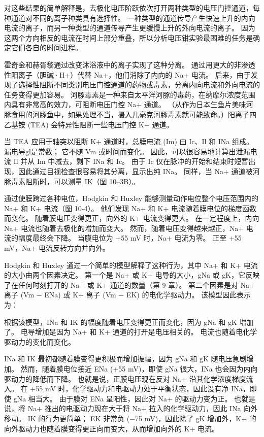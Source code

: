 对这些结果的简单解释是，去极化电压阶跃依次打开两种类型的电压门控通道，每种通道对不同的离子种类具有选择性。 一种类型的通道传导产生快速上升的内向电流的离子，而另一种类型的通道传导产生更缓慢上升的外向电流的离子。 因为这两个方向相反的电流在时间上部分重叠，所以分析电压钳实验最困难的任务是确定它们各自的时间进程。

霍奇金和赫胥黎通过改变沐浴液中的离子实现了这种分离。 通过用更大的非渗透性阳离子（胆碱·H+）代替 Na+，他们消除了内向的 Na+ 电流。 后来，由于发现了选择性阻断不同类别电压门控通道的药物或毒素，分离内向电流和外向电流的任务变得更加容易。 河豚毒素是一种来自太平洋河豚的毒药，在纳摩尔浓度范围内具有非常高的效力，可阻断电压门控 Na+ 通道。 （从作为日本生鱼片美味河豚食用的河豚鱼中，如果处理不当，摄入几毫克河豚毒素就可能致命。）阳离子四乙基铵 (TEA) 会特异性阻断一些电压门控 K+ 通道。

当 TEA 应用于轴突以阻断 K+ 通道时，总膜电流 (Im) 由 Ic、Il 和 INa 组成。 漏电导gl是常数； 它不随 Vm 或时间而变化。 因此，可以很容易地计算出泄漏电流 Il 并从 Im 中减去，剩下 INa 和 Ic。 由于 Ic 仅在脉冲的开始和结束时短暂出现，因此通过目视检查很容易将其分离，显示出纯 INa。 同样，当 Na+ 通道被河豚毒素阻断时，可以测量 IK（图 10–3B）。

通过使膜跨过各种电位，Hodgkin 和 Huxley 能够测量动作电位整个电压范围内的 Na+ 和 K+ 电流（图 10-4）。 他们发现 Na+ 和 K+ 电流随着膜电位的梯度函数而变化。 随着膜电压变得更正，向外的 K+ 电流变得更大。 在一定程度上，内向 Na+ 电流也随着去极化的增加而变大。 然而，随着电压变得越来越正，Na+ 电流的幅度最终会下降。 当膜电位为 +55 mV 时，Na+ 电流为零。 正至 +55 mV，Na+ 电流反转方向并向外。

Hodgkin 和 Huxley 通过一个简单的模型解释了这种行为，其中 Na+ 和 K+ 电流的大小由两个因素决定。 第一个是 Na+ 或 K+ 电导的大小，gNa 或 gK，它反映了在任何时刻打开的 Na+ 或 K+ 通道的数量（第 9 章）。 第二个因素是对 Na+ 离子 (Vm − ENa) 或 K+ 离子 (Vm − EK) 的电化学驱动力。 该模型因此表示为：

根据该模型，INa 和 IK 的幅度随着电压变得更正而变化，因为 gNa 和 gK 增加了。 电导增加是因为 Na+ 和 K+ 通道的打开是电压相关的。 电流也随着电化学驱动力的变化而变化。

INa 和 IK 最初都随着膜变得更积极而增加振幅，因为 gNa 和 gK 随电压急剧增加。 然而，随着膜电位接近 ENa (+55 mV)，即使 gNa 很大，INa 也会因为内向驱动力的降低而下降。 也就是说，正膜电压现在反对 Na+ 沿其化学浓度梯度流入。 在 +55 mV 时，化学驱动力和电驱动力处于平衡状态，因此没有净 INa，即使 gNa 相当大。 由于膜对 ENa 呈阳性，因此对 Na+ 的驱动力变为正。 也就是说，将 Na+ 推出的电驱动力现在大于将 Na+ 拉入的化学驱动力，因此 INa 向外移动。 IK 的行为更简单； EK 非常负 (−75 mV)，因此除了 gK 增加外，K+ 的向外驱动力也随着膜变得更正向而变大，从而增加向外的 K+ 电流。



